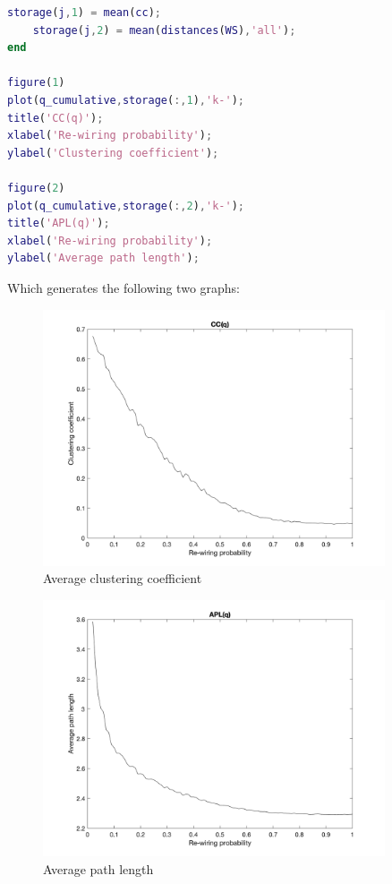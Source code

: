 \documentclass{article}
\begin{document}
\begin{itemize}
\begin{lstlisting}[language=Matlab]
    storage(j,1) = mean(cc);
    storage(j,2) = mean(distances(WS),'all');
end

figure(1)
plot(q_cumulative,storage(:,1),'k-');
title('CC(q)');
xlabel('Re-wiring probability');
ylabel('Clustering coefficient');

figure(2)
plot(q_cumulative,storage(:,2),'k-');
title('APL(q)');
xlabel('Re-wiring probability');
ylabel('Average path length');
\end{lstlisting}
        
        \noindent Which generates the following two graphs:
        
        \begin{figure}[H]
            \centering
            \includegraphics[width=0.9\textwidth]{1.png}
            \caption{Average clustering coefficient}
            \label{fig:figure-1}
        \end{figure}
        \begin{figure}[H]
            \centering
            
            \includegraphics[width=0.9\textwidth]{2.png}
            \caption{Average path length}
            \label{fig:figure-2}
        \end{figure}
        

\end{itemize}
\end{document}
